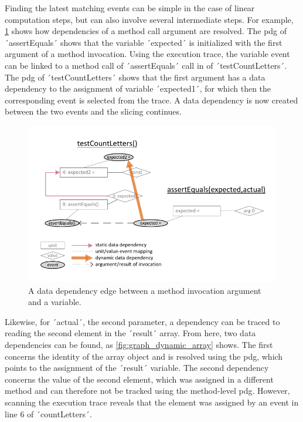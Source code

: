 Finding the latest matching events can be simple in the case of linear computation steps, but can also involve several intermediate steps.
For example, \cref{fig:graph_dynamic_arg} shows how dependencies of a method call argument are resolved.
The \ac{pdg} of ´assertEquals´ shows that the variable ´expected´ is initialized with the first argument of a method invocation.
Using the execution trace, the variable event can be linked to a method call of ´assertEquals´ call in  of ´testCountLetters´.
The \ac{pdg} of ´testCountLetters´ shows that the first argument has a data dependency to the assignment of variable ´expected1´, for which then the corresponding event is selected from the trace.
A data dependency is now created between the two events and the slicing continues.

\begin{figure}[tp]
\centering
\includegraphics[width=.8\linewidth, clip, trim=6mm 6mm 6mm 7mm]{img/graph_dynamic_arg}
\caption{A data dependency edge between a method invocation argument and a variable.}
\label{fig:graph_dynamic_arg}
\end{figure}

Likewise, for ´actual´, the second parameter, a dependency can be traced to reading the second element in the ´result´ array.
From here, two data dependencies can be found, as \cref{fig:graph_dynamic_array} shows.
The first concerns the identity of the array object and is resolved using the \ac{pdg}, which points to the assignment of the ´result´ variable.
The second dependency concerns the value of the second element, which was assigned in a different method and can therefore not be tracked using the method-level \ac{pdg}.
However, scanning the execution trace reveals that the element was assigned by an event in line 6 of ´countLetters´.

